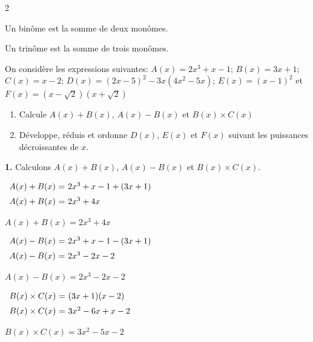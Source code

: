 \begin{multicols*}{2}
{  		 Un binôme est la somme de deux monômes.
  		
  		 Un trinôme est la somme de trois monômes. }
  	
  	
  	
  	On considère les expressions suivantes: $A(x)=2x^3+x-1$; $B(x)=3x+1$; $C(x)=x-2$; $D(x)=\left(2x-5\right)^2-3x\left(4x^2-5x\right)$; $E(x)=\left(x-1\right)^2$ et $F(x)=(x-\sqrt{2})(x+\sqrt{2})$
  	\begin{enumerate}
  		\item Calcule $A(x)+B(x)$, $A(x)-B(x)$  et $B(x)\times C(x)$
  		\item Développe, réduis et ordonne $D(x)$, $E(x)$ et $F(x)$ suivant les puissances décroissantes de $x$. 
  	\end{enumerate}
  	\dure
  	\resul
  	\textbf{1.} Calculons $A(x)+B(x)$, $A(x)-B(x)$  et $B(x)\times C(x)$.
  	
  	$\begin{array}{r@{\ =\ }l} \vspace{0.2cm}
  		A(x)+B(x) &2x^3+x-1 + (3x+1)\\
  		
  		A(x)+B(x)	&2x^3+4x \\	
  	\end{array}$
  	
  	\underline{\underline{$A(x)+B(x)	=2x^3+4x$ }}
  	
  	$\begin{array}{r@{\ =\ }l} \vspace{0.2cm}
  		A(x)-B(x) &2x^3+x-1 - (3x+1)\\
  		
  		A(x)-B(x)	&2x^3-2x -2\\	
  	\end{array}$
  	
  	\underline{\underline{$A(x)-B(x)	=2x^3-2x -2$}}
  	
  	$\begin{array}{r@{\ =\ }l} \vspace{0.2cm}
  		B(x)\times C(x) & (3x+1)(x-2)\\
  		
  		B(x)\times C(x)	&3x^2-6x +x-2\\	
  	\end{array}$
  	
  	\underline{\underline{$B(x)\times C(x)	=3x^2-5x -2$}}
  	

\end{multicols*}
